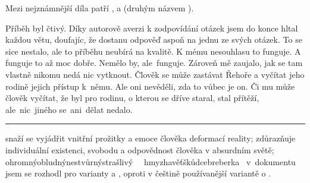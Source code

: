 \documentclass{extarticle} %
\begin{document}

\noindent 
Mezi nejznámnější díla patří , 
a  (druhým názvem ).






\noindent Příběh byl čtivý. Díky autorově averzi k zodpovídání otázek jsem do konce hltal každou větu,
doufajíc, že dostanu odpověď aspoň na jednu ze svých otázek.
To se sice nestalo, ale to příběhu neubírá na kvalitě.
K mému nesouhlasu to funguje. A funguje to až moc dobře.
Nemělo by, ale~funguje. Zároveň mě zaujalo, jak se tam vlastně nikomu nedá nic vytknout.
Člověk se může zastávat Řehoře a vyčítat jeho rodině jejich přístup k~němu.
Ale oni nevěděli, zda to vůbec je on.
Či mu může člověk vyčítat, že byl pro rodinu, o kterou se dříve staral, stal přítěží,
ale~nic~jiného se~ani~dělat nedalo.

\vfill

\noindent\begin{minipage}{\textwidth}
    {\textcolor{\wpagecolor}{\rule{\linewidth}{0.4pt}}
    \footnotesize
     snaží se vyjádřit vnitřní prožitky a emoce člověka deformací reality;
     zdůrazňuje individuální existenci, svobodu a odpovědnost člověka v absurdním světě;
     ohromný\wsl obludný\wsl nestvůrný\wsl strašlivý~
    \textbfhl{\leftrightarrow}{ }~hmyz\wsl havěť\wsl škůdce\wsl breberka
    \textbfhl{$\Rightarrow$}~v~dokumentu jsem se rozhodl pro varianty  a ,
    oproti v češtině používanější variantě o .
    }
\end{minipage}

\newpage


\changefontsize{8pt}

\end{document}
